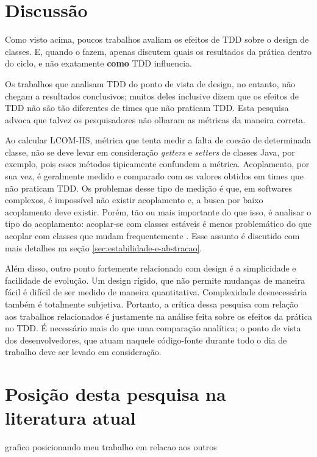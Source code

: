 



\section{Discussão}

Como visto acima, poucos trabalhos avaliam os efeitos de TDD sobre o design de
classes. E, quando o fazem, apenas discutem quais os resultados da prática
dentro do ciclo, e não exatamente \textbf{como} TDD influencia. 

Os trabalhos que analisam TDD do ponto de vista de design, no entanto, não
chegam a resultados conclusivos; muitos deles inclusive dizem que os efeitos
de TDD não são tão diferentes de times que não praticam TDD. Esta pesquisa
advoca que talvez os pesquisadores não olharam as métricas da maneira correta.

Ao calcular LCOM-HS, métrica que tenta medir a falta de coesão de determinada
classe, não se deve levar em consideração \textit{getters} e \textit{setters} de
classes Java, por exemplo, pois esses métodos tipicamente confundem a métrica.
Acoplamento, por sua vez, é geralmente medido e comparado com os valores
obtidos em times que não praticam TDD. Os problemas desse tipo de medição é que,
em softwares complexos, é impossível não existir acoplamento e, a busca por
baixo acoplamento deve existir. Porém, tão ou mais importante do que isso, é
analisar o tipo do acoplamento: acoplar-se com classes estáveis é menos
problemático do que acoplar com classes que mudam frequentemente
\cite{bob-martin}. Esse assunto é discutido com mais detalhes na seção
\ref{sec:estabilidade-e-abstracao}.

Além disso, outro ponto fortemente relacionado com design é a simplicidade e
facilidade de evolução. Um design rígido, que não permite mudanças de maneira
fácil é difícil de ser medido de maneira quantitativa. Complexidade
desnecessária também é totalmente subjetiva. Portanto, a crítica dessa pesquisa
com relação aos trabalhos relacionados é justamente na análise feita sobre os
efeitos da prática no TDD. É necessário mais do que uma comparação analítica; o
ponto de vista dos desenvolvedores, que atuam naquele código-fonte durante todo
o dia de trabalho deve ser levado em consideração.

\section{Posição desta pesquisa na literatura atual}

grafico posicionando meu trabalho em relacao aos outros
